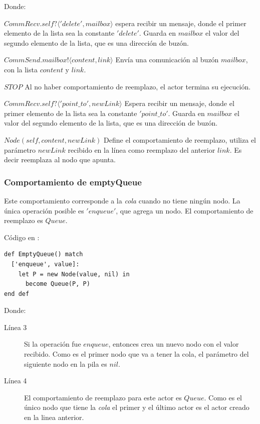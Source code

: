 Donde: 

\begin{description}
 \item $CommRecv.self?\langle 'delete', mailbox \rangle$ espera recibir un mensaje, donde el primer elemento de la lista sea la constante $'delete'$. Guarda en $mailbox$ el valor del segundo elemento de la lista, que es una dirección de buzón.
 \item $CommSend.mailbox!\langle content, link \rangle$ Envía una comunicación al buzón $mailbox$, con la lista $content$ y $link$.
 \item $STOP$ Al no haber comportamiento de reemplazo, el actor termina su ejecución.
 \item $CommRecv.self?\langle 'point\_to', newLink \rangle$ Espera recibir un mensaje, donde el primer elemento de la lista sea la constante $'point\_to'$. Guarda en $mailbox$ el valor del segundo elemento de la lista, que es una dirección de buzón.
 \item $Node(self, content, newLink)$ Define el comportamiento de reemplazo, utiliza el parámetro $newLink$ recibido en la línea como reemplazo del anterior $link$. Es decir reemplaza al nodo que apunta.
\end{description}

\subsubsection*{Comportamiento de emptyQueue}
Este comportamiento corresponde a la \textit{cola} cuando no tiene ningún nodo. La única operación posible es $'enqueue'$, que agrega un nodo. El comportamiento de reemplazo es $Queue$.

Código en \SAL:

\begin{lstlisting}[language=sal, style=simple]
def EmptyQueue() match
  ['enqueue', value]:
    let P = new Node(value, nil) in
      become Queue(P, P)
end def
\end{lstlisting}

Donde:

\begin{description}
 \item [Línea 3] Si la operación fue $enqueue$, entonces crea un nuevo nodo con el valor recibido. Como es el primer nodo que va a tener la cola, el parámetro del siguiente nodo en la pila es $nil$.
 \item [Línea 4] El comportamiento de reemplazo para este actor es $Queue$. Como es el único nodo que tiene la \textit{cola} el primer y el último actor es el actor creado en la linea anterior.
\end{description}

